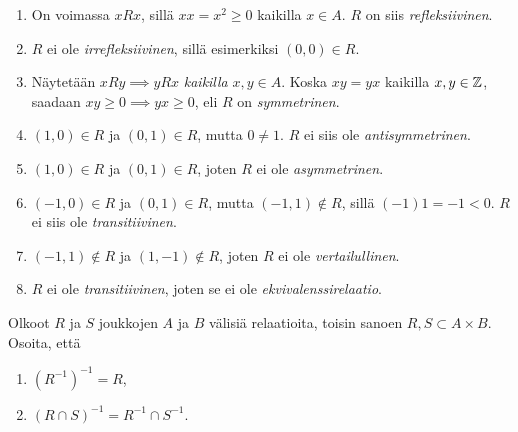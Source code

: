 \documentclass[11pt,a4paper]{amsart}
\begin{document}
\begin{solution}
\leavevmode\par
\begin{enumerate}[label=\alph*), nosep]
\item On voimassa \(xRx\), sillä \(xx = x^2 \geq 0\) kaikilla \(x \in A\).
  \(R\) on siis \emph{refleksiivinen}.
\item \(R\) ei ole \emph{irrefleksiivinen}, sillä esimerkiksi \((0, 0) \in R\).
\item Näytetään \(xRy \implies yRx\) \emph{kaikilla} \(x,y \in A\).
  Koska \(xy = yx\) kaikilla \(x, y \in \mathbb{Z}\), saadaan
  \(xy \geq 0 \implies yx \geq 0\), eli \(R\) on \emph{symmetrinen}.
\item \((1, 0) \in R\) ja \((0, 1) \in R\), mutta \(0 \neq 1\). \(R\)
  ei siis ole \emph{antisymmetrinen}.
\item \((1, 0) \in R\) ja \((0, 1) \in R\), joten \(R\) ei ole
  \emph{asymmetrinen}.
\item \((-1, 0) \in R\) ja \((0, 1) \in R\), mutta \((-1, 1) \notin R\),
  sillä \((-1)1 = -1 < 0\). \(R\) ei siis ole \emph{transitiivinen}.
\item \((-1, 1) \notin R\) ja \((1, -1) \notin R\), joten \(R\) ei ole
  \emph{vertailullinen}.
\item \(R\) ei ole \emph{transitiivinen}, joten se ei ole
  \emph{ekvivalenssirelaatio}.
\end{enumerate}
\end{solution}

\begin{exercise}
Olkoot \(R\) ja \(S\) joukkojen \(A\) ja \(B\) välisiä relaatioita, toisin
sanoen \(R, S \subset A \times B\). Osoita, että
\begin{enumerate}[label=\alph*), nosep]
\item \((R^{-1})^{-1} = R\),
\item \((R \cap S)^{-1} = R^{-1} \cap S^{-1}\).
\end{enumerate}
\end{exercise}
\end{document}
